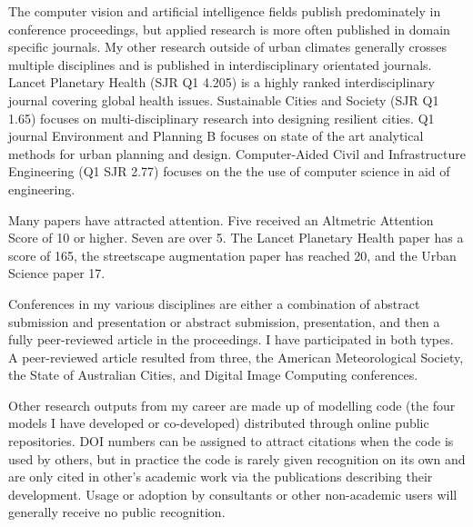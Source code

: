 The computer vision and artificial intelligence fields publish predominately in conference proceedings, but applied research is more often published in domain specific journals. My other research outside of urban climates generally crosses multiple disciplines and is published in interdisciplinary orientated journals. Lancet Planetary Health (SJR Q1 4.205) is a highly ranked interdisciplinary journal covering global health issues. Sustainable Cities and Society (SJR Q1 1.65) focuses on multi-disciplinary research into designing resilient cities. Q1 journal Environment and Planning B focuses on state of the art analytical methods for urban planning and design. Computer-Aided Civil and Infrastructure Engineering (Q1 SJR 2.77) focuses on the the use of computer science in aid of engineering.

Many papers have attracted attention. Five received an Altmetric Attention Score of 10 or higher. Seven are over 5. The Lancet Planetary Health paper has a score of 165, the streetscape augmentation paper has reached 20, and the Urban Science paper 17.

Conferences in my various disciplines are either a combination of abstract submission and presentation or abstract submission, presentation, and then a fully peer-reviewed article in the proceedings. I have participated in both types. A peer-reviewed article resulted from three, the American Meteorological Society, the State of Australian Cities, and Digital Image Computing conferences.

Other research outputs from my career are made up of modelling code (the four models I have developed or co-developed) distributed through online public repositories. DOI numbers can be assigned to attract citations when the code is used by others, but in practice the code is rarely given recognition on its own and are only cited in other's academic work via the publications describing their development. Usage or adoption by consultants or other non-academic users will generally receive no public recognition.















%
